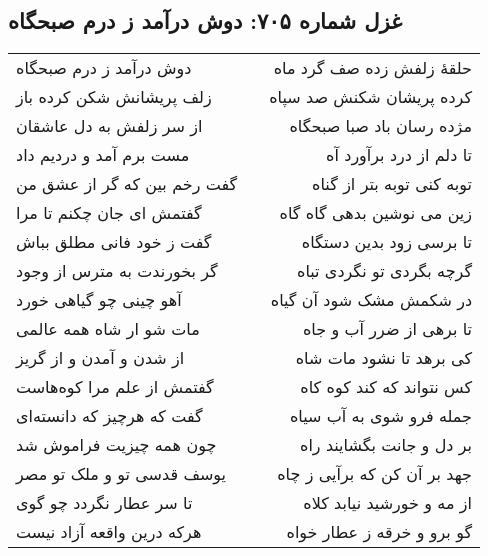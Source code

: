 \begin{center}
\section*{غزل شماره ۷۰۵: دوش درآمد ز درم صبحگاه}
\label{sec:705}
\begin{longtable}{l p{0.5cm} r}
دوش درآمد ز درم صبحگاه
&&
حلقهٔ زلفش زده صف گرد ماه
\\
زلف پریشانش شکن کرده باز
&&
کرده پریشان شکنش صد سپاه
\\
از سر زلفش به دل عاشقان
&&
مژده رسان باد صبا صبحگاه
\\
مست برم آمد و دردیم داد
&&
تا دلم از درد برآورد آه
\\
گفت رخم بین که گر از عشق من
&&
توبه کنی توبه بتر از گناه
\\
گفتمش ای جان چکنم تا مرا
&&
زین می نوشین بدهی گاه گاه
\\
گفت ز خود فانی مطلق بباش
&&
تا برسی زود بدین دستگاه
\\
گر بخورندت به مترس از وجود
&&
گرچه بگردی تو نگردی تباه
\\
آهو چینی چو گیاهی خورد
&&
در شکمش مشک شود آن گیاه
\\
مات شو ار شاه همه عالمی
&&
تا برهی از ضرر آب و جاه
\\
از شدن و آمدن و از گریز
&&
کی برهد تا نشود مات شاه
\\
گفتمش از علم مرا کوه‌هاست
&&
کس نتواند که کند کوه کاه
\\
گفت که هرچیز که دانسته‌ای
&&
جمله فرو شوی به آب سیاه
\\
چون همه چیزیت فراموش شد
&&
بر دل و جانت بگشایند راه
\\
یوسف قدسی تو و ملک تو مصر
&&
جهد بر آن کن که برآیی ز چاه
\\
تا سر عطار نگردد چو گوی
&&
از مه و خورشید نیابد کلاه
\\
هرکه درین واقعه آزاد نیست
&&
گو برو و خرقه ز عطار خواه
\\
\end{longtable}
\end{center}
